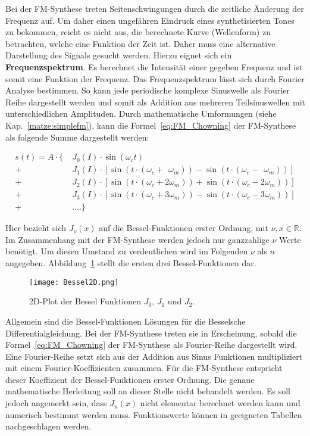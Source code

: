 Bei der FM-Synthese treten Seitenschwingungen durch die zeitliche Änderung der Frequenz auf. Um daher einen ungefähren Eindruck eines synthetisierten Tones zu bekommen, reicht es nicht aus, die berechnete Kurve (Wellenform) zu betrachten, welche eine Funktion der Zeit ist. Daher muss eine alternative Darstellung des Signals gesucht werden. 
Hierzu eignet sich ein \textbf{Frequenzspektrum}. Es berechnet die Intensität einer gegeben Frequenz und ist somit eine Funktion der Frequenz. Das Frequenzspektrum lässt sich durch Fourier Analyse bestimmen. So kann jede periodische komplexe Sinuswelle als Fourier Reihe dargestellt werden und somit als Addition aus mehreren Teilsinuswellen mit unterschiedlichen Amplituden. \cite[S. 33]{raichel} Durch mathematische Umformungen (siehe Kap.~\ref{matze:simplefm}), kann die Formel~\ref{eq:FM_Chowning} der FM-Synthese als folgende Summe dargestellt werden: \cite{chowningPaper}

\begin{equation}
\begin{split}
s(t)=A\cdot \{\; & J_0(I)\cdot\sin(\omega_c t)  \\
         +&J_1(I)\cdot [\sin(t\cdot (\omega_c + \;\,\omega_m))-\sin(t\cdot (\omega_c-\;\,\omega_m))] \\
         +&J_2(I)\cdot [\sin(t\cdot (\omega_c + 2\omega_m))+\sin(t\cdot (\omega_c-2\omega_m))] \\
         +&J_3(I)\cdot [\sin(t\cdot (\omega_c + 3\omega_m))-\sin(t\cdot (\omega_c-3\omega_m))] \\
         +&....\}
\end{split}
\label{eq:chowningAddition}
\end{equation}

Hier bezieht sich $J_\nu(x)$ auf die Bessel-Funktionen erster Ordnung, mit $\nu,x \in \mathbb{R}$. \cite[S. 223]{temme} Im Zusammenhang mit der FM-Synthese werden jedoch nur ganzzahlige $\nu$ Werte benötigt. Um diesen Umstand zu verdeutlichen wird im Folgenden $\nu$ als $n$ angegeben. Abbildung~\ref{fig:bessel2D} stellt die ersten drei Bessel-Funktionen dar.

\begin{figure} [ht]
\centering
  \texttt{[image: Bessel2D.png]}
\caption{2D-Plot der Bessel Funktionen $J_0$, $J_1$ und $J_2$.}
\label{fig:bessel2D}
\end{figure}

\FloatBarrier


Allgemein sind die Bessel-Funktionen Lösungen für die Besselsche Differentialgleichung.\cite[S. 220]{temme} Bei der FM-Synthese treten sie in Erscheinung, sobald die Formel~\ref{eq:FM_Chowning} der FM-Synthese als Fourier-Reihe dargestellt wird. Eine Fourier-Reihe setzt sich aus der Addition aus Sinus Funktionen multipliziert mit einem Fourier-Koeffizienten zusammen. Für die FM-Synthese entspricht dieser Koeffizient der Bessel-Funktionen erster Ordnung. \cite[S. 221]{lathi} Die genaue mathematische Herleitung soll an dieser Stelle nicht behandelt werden. Es soll jedoch angemerkt sein, dass $J_n(x)$ nicht elementar berechnet werden kann und numerisch bestimmt werden muss.\cite[S. 385]{abramowitz} Funktionswerte können in geeigneten Tabellen nachgeschlagen werden. \cite{davis}

